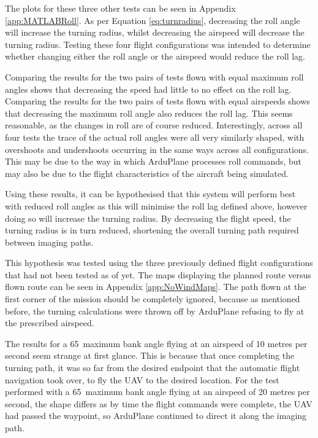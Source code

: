 
The plots for these three other tests can be seen in Appendix \ref{app:MATLABRoll}. As per Equation \ref{eq:turnradius}, decreasing the roll angle will increase the turning radius, whilst decreasing the airspeed will decrease the turning radius. Testing these four flight configurations was intended to determine whether changing either the roll angle or the airspeed would reduce the roll lag. 

Comparing the results for the two pairs of tests flown with equal maximum roll angles shows that decreasing the speed had little to no effect on the roll lag. Comparing the results for the two pairs of tests flown with equal airspeeds shows that decreasing the maximum roll angle also reduces the roll lag. This seems reasonable, as the changes in roll are of course reduced. Interestingly, across all four tests the trace of the actual roll angles were all very similarly shaped, with overshoots and undershoots occurring in the same ways across all configurations. This may be due to the way in which ArduPlane processes roll commands, but may also be due to the flight characteristics of the aircraft being simulated.


Using these results, it can be hypothesised that this system will perform best with reduced roll angles as this will minimise the roll lag defined above, however doing so will increase the turning radius. By decreasing the flight speed, the turning radius is in turn reduced, shortening the overall turning path required between imaging paths. 

This hypothesis was tested using the three previously defined flight configurations that had not been tested as of yet. The maps displaying the planned route versus flown route can be seen in Appendix \ref{app:NoWindMaps}. The path flown at the first corner of the mission should be completely ignored, because as mentioned before, the turning calculations were thrown off by ArduPlane refusing to fly at the prescribed airspeed. 

The results for a 65\degree\ maximum bank angle flying at an airspeed of 10 metres per second seem strange at first glance. This is because that once completing the turning path, it was so far from the desired endpoint that the automatic flight navigation took over, to fly the UAV to the desired location. For the test performed with a 65\degree\ maximum bank angle flying at an airspeed of 20 metres per second, the shape differs as by time the flight commands were complete, the UAV had passed the waypoint, so ArduPlane continued to direct it along the imaging path. 

